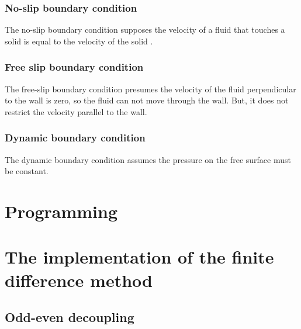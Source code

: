 \documentclass{article}
\begin{document}
\subsubsection{No-slip boundary condition} \label{no-slip boundary condition}
The no-slip boundary condition supposes the velocity of a fluid that touches a solid is equal to the velocity of the solid \cite{no-slip boundary condition}.
\subsubsection{Free slip boundary condition}
The free-slip boundary condition presumes the velocity of the fluid perpendicular to the wall is zero, so the fluid can not move through the wall. But, it does not restrict the velocity parallel to the wall.\cite{free slip boundary condition} 
\subsubsection{Dynamic boundary condition}
The dynamic boundary condition assumes the pressure on the free surface must be constant.
\newpage
\section{Programming}
\section{The implementation of the finite difference method}
\subsection{Odd-even decoupling} \label{odd-even}
\end{document}
